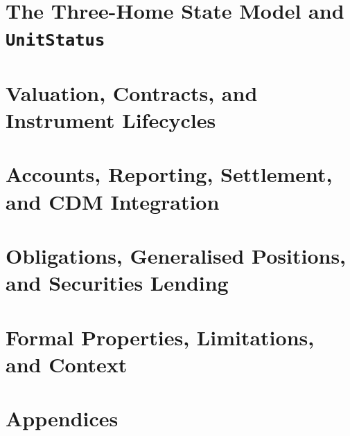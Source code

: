 \documentclass[11pt,a4paper]{article}
\begin{document}
\part{The Three-Home State Model and \texorpdfstring{\texttt{UnitStatus}}{UnitStatus}}



\part{Valuation, Contracts, and Instrument Lifecycles}






\part{Accounts, Reporting, Settlement, and CDM Integration}






\part{Obligations, Generalised Positions, and Securities Lending}




\part{Formal Properties, Limitations, and Context}






\appendix
\part{Appendices}









\end{document}
